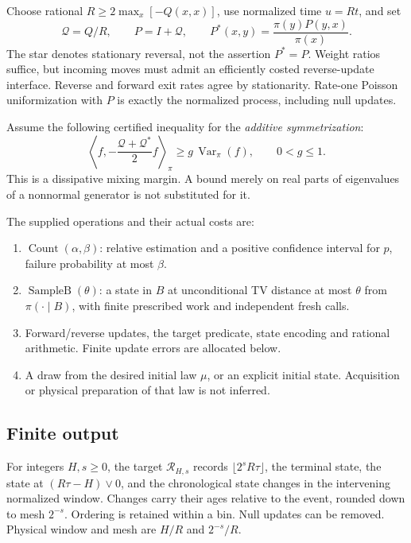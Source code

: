 \documentclass[10pt,a4paper]{article}
\begin{document}
Choose rational $R\ge2\max_x[-Q(x,x)]$, use normalized time $u=Rt$, and set
\[
\mathcal Q=Q/R,\qquad P=I+\mathcal Q,\qquad
P^*(x,y)=\frac{\pi(y)P(y,x)}{\pi(x)}.
\]
The star denotes stationary reversal, not the assertion $P^*=P$. Weight ratios suffice, but incoming moves must admit an efficiently costed reverse-update interface. Reverse and forward exit rates agree by stationarity. Rate-one Poisson uniformization with $P$ is exactly the normalized process, including null updates.

Assume the following certified inequality for the \emph{additive symmetrization}:
\begin{equation}
\left\langle f,-\frac{\mathcal Q+\mathcal Q^*}{2}f\right\rangle_\pi
\ge g\,\operatorname{Var}_\pi(f),\qquad 0<g\le1. \label{eq:gap}
\end{equation}
This is a dissipative mixing margin. A bound merely on real parts of eigenvalues of a nonnormal generator is not substituted for it.

The supplied operations and their actual costs are:
\begin{enumerate}
\item $\operatorname{Count}(\alpha,\beta)$: relative estimation and a positive confidence interval for $p$, failure probability at most $\beta$.
\item $\operatorname{SampleB}(\theta)$: a state in $B$ at unconditional TV distance at most $\theta$ from $\pi(\cdot\mid B)$, with finite prescribed work and independent fresh calls.
\item Forward/reverse updates, the target predicate, state encoding and rational arithmetic. Finite update errors are allocated below.
\item A draw from the desired initial law $\mu$, or an explicit initial state. Acquisition or physical preparation of that law is not inferred.
\end{enumerate}

\subsection{Finite output}
For integers $H,s\ge0$, the target $\mathcal R_{H,s}$ records
$\lfloor2^sR\tau\rfloor$, the terminal state, the state at $(R\tau-H)\vee0$, and the chronological state changes in the intervening normalized window. Changes carry their ages relative to the event, rounded down to mesh $2^{-s}$. Ordering is retained within a bin. Null updates can be removed. Physical window and mesh are $H/R$ and $2^{-s}/R$.
\end{document}

